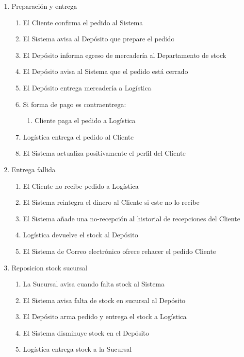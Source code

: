 \begin{enumerate}
 \item Preparación y entrega
  \begin{enumerate}
    \item El Cliente confirma el pedido al Sistema
    \item El Sistema avisa al Depósito que prepare el pedido 
    \item El Depósito informa egreso de mercadería al Departamento de stock
    \item El Depósito avisa al Sistema que el pedido está cerrado
    \item El Depósito entrega mercadería a Logística
    \item Si forma de pago es contraentrega: 
    \begin{enumerate}
      \item Cliente paga el pedido a Logística
    \end{enumerate}
    \item Logística entrega el pedido al Cliente
    \item El Sistema actualiza positivamente el perfil del Cliente
  \end{enumerate}

 \item Entrega fallida
  \begin{enumerate}
    \item El Cliente no recibe pedido a Logística
    \item El Sistema reintegra el dinero al Cliente si este no lo recibe
    \item El Sistema añade una no-recepción al historial de recepciones del Cliente
    \item Logística devuelve el stock al Depósito
    \item El Sistema de Correo electrónico ofrece rehacer el pedido Cliente
  \end{enumerate}

 \item Reposicion stock sucursal
  \begin{enumerate}
    \item La Sucursal avisa cuando falta stock al Sistema
    \item El Sistema avisa falta de stock en sucursal al Depósito
    \item El Depósito arma pedido y entrega el stock a Logística
    \item El Sistema disminuye stock en el Depósito
    \item Logística entrega stock a la Sucursal
  \end{enumerate}


\end{enumerate}
